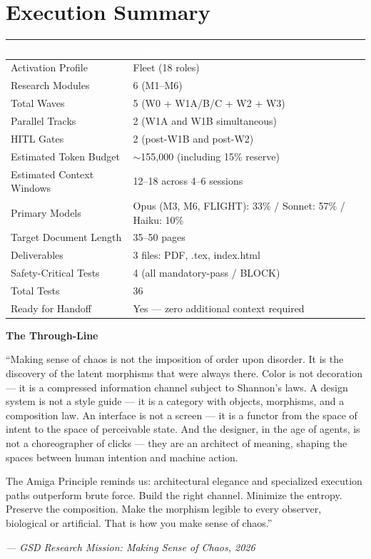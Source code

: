 \documentclass[11pt,letterpaper]{article}
\newcommand{\tableheader}[1]{\textbf{\sffamily\textcolor{white}{#1}}}
\begin{document}
\section{Execution Summary}

\begin{center}
\begin{tabularx}{\textwidth}{L{5cm}X}
\toprule
{}
\tableheader{Metric} & \tableheader{Value} \\
\midrule
Activation Profile & Fleet (18 roles) \\
Research Modules & 6 (M1--M6) \\
Total Waves & 5 (W0 + W1A/B/C + W2 + W3) \\
Parallel Tracks & 2 (W1A and W1B simultaneous) \\
HITL Gates & 2 (post-W1B and post-W2) \\
Estimated Token Budget & $\sim$155,000 (including 15\% reserve) \\
Estimated Context Windows & 12--18 across 4--6 sessions \\
Primary Models & Opus (M3, M6, FLIGHT): 33\% / Sonnet: 57\% / Haiku: 10\% \\
Target Document Length & 35--50 pages \\
Deliverables & 3 files: PDF, .tex, index.html \\
Safety-Critical Tests & 4 (all mandatory-pass / BLOCK) \\
Total Tests & 36 \\
Ready for Handoff & Yes --- zero additional context required \\
\bottomrule
\end{tabularx}
\end{center}

\vspace{2em}

\begin{quotebox}
\textbf{\sffamily\textcolor{primary}{The Through-Line}}

\vspace{0.5em}
``Making sense of chaos is not the imposition of order upon disorder. It is the discovery of the latent morphisms that were always there. Color is not decoration --- it is a compressed information channel subject to Shannon's laws. A design system is not a style guide --- it is a category with objects, morphisms, and a composition law. An interface is not a screen --- it is a functor from the space of intent to the space of perceivable state. And the designer, in the age of agents, is not a choreographer of clicks --- they are an architect of meaning, shaping the spaces between human intention and machine action.

The Amiga Principle reminds us: architectural elegance and specialized execution paths outperform brute force. Build the right channel. Minimize the entropy. Preserve the composition. Make the morphism legible to every observer, biological or artificial. That is how you make sense of chaos.''

\vspace{0.5em}
{\small\sffamily\textit{--- GSD Research Mission: Making Sense of Chaos, 2026}}
\end{quotebox}
\end{document}
